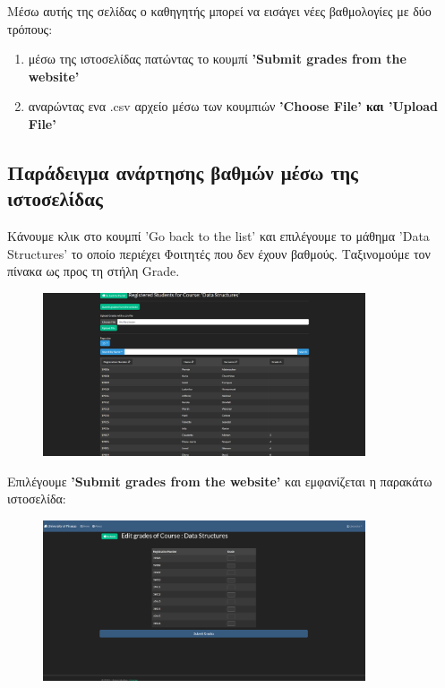 \documentclass[12pt]{article}
\begin{document}
	
	Μέσω αυτής της σελίδας ο καθηγητής μπορεί να εισάγει νέες βαθμολογίες με δύο τρόπους: 
	
	\begin{enumerate}
		\item μέσω της ιστοσελίδας πατώντας το κουμπί \textbf{'Submit grades from the website'}
		
		\item αναρώντας ενα .csv αρχείο μέσω των κουμπιών \textbf{'Choose File' και 'Upload File'}
	\end{enumerate}

	\subsection{Παράδειγμα ανάρτησης βαθμών μέσω της ιστοσελίδας}

	Κάνουμε κλικ στο κουμπί 'Go back to the list' και επιλέγουμε το μάθημα 'Data Structures' το οποίο περιέχει Φοιτητές που δεν έχουν βαθμούς. Ταξινομούμε τον πίνακα ως προς τη στήλη Grade.
	
	\begin{figure}[H]
		\centering
		\includegraphics[width=0.85\textwidth]{datas.png}
		\caption{}
		\label{fig:emptyView}
	\end{figure}

	Επιλέγουμε \textbf{'Submit grades from the website'} και εμφανίζεται η παρακάτω ιστοσελίδα:
	
		\begin{figure}[H]
		\centering
		\includegraphics[width=0.85\textwidth]{edits23.png}
		\caption{}
		\label{fig:emptyView}
		\end{figure}
	
\end{document}
